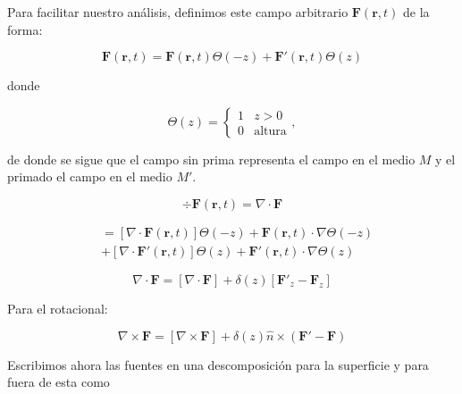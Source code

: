 Para facilitar nuestro análisis, definimos este campo arbitrario $\mathbf{F}(\mathbf r,t)$ de la forma:

\begin{equation}
    \mathbf{F}(\mathbf r,t) = \mathbf{F}(\mathbf r,t)\Theta(-z) + \mathbf{F}'(\mathbf r,t)\Theta(z)
    \label{eq:field_piecewise}
\end{equation}

donde

\begin{equation}
    \Theta(z) =
    \begin{cases}
        1 & z>0 \\
        0 & \text{altura}
    \end{cases}, 
\end{equation}

de donde se sigue que el campo sin prima representa el campo en el medio $M$ y el primado el campo en el medio $M'$. 


\begin{equation} 
    \div \mathbf{F}(\mathbf r,t) = \nabla \cdot \mathbf{F}
\end{equation}

\begin{equation}
    \begin{split}
        &= [\nabla \cdot \mathbf{F}(\mathbf r,t)] \Theta(-z) + \mathbf{F}(\mathbf r,t) \cdot \nabla \Theta(-z) \\
        &+ [\nabla \cdot \mathbf{F}'(\mathbf r,t)] \Theta(z) + \mathbf{F}'(\mathbf r,t) \cdot \nabla \Theta(z)
    \end{split}
\end{equation}

\begin{equation}
    \nabla \cdot \mathbf{F} = [\nabla \cdot \mathbf{F}] + \delta(z) [\mathbf{F}'_z - \mathbf{F}_z]
    \label{eq:div_field}
\end{equation}

\pagebreak

Para el rotacional:

\begin{equation}
    \nabla \times \mathbf{F} = [\nabla \times \mathbf{F}] + \delta(z) \hat{n} \times (\mathbf{F}' - \mathbf{F})
    \label{eq:curl_field}
\end{equation}

Escribimos ahora las fuentes en una descomposición para la superficie
y para fuera de esta como

